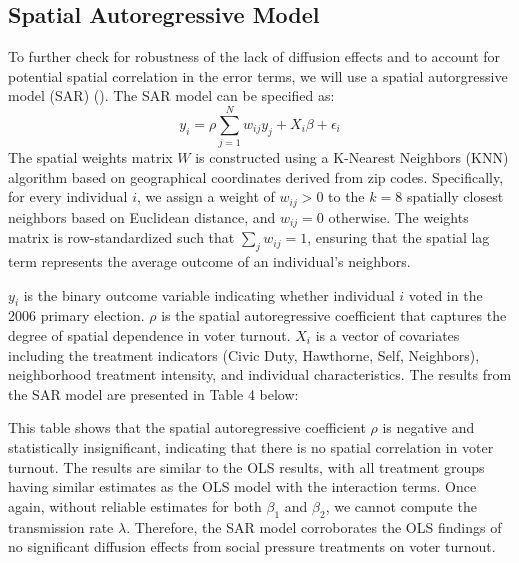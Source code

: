 \documentclass[11pt]{article}
\begin{document}
\subsection{Spatial Autoregressive Model}
To further check for robustness of the lack of diffusion effects and to account for potential spatial correlation in the error terms, we will use a spatial autorgressive model (SAR) (\cite{lord_chapter_2021}). The SAR model can be specified as:
\begin{equation}
y_i = \rho \sum_{j=1}^{N} w_{ij} y_j + X_i \beta + \epsilon_i
\end{equation}
The spatial weights matrix $W$ is constructed using a K-Nearest Neighbors (KNN) algorithm based on geographical coordinates derived from zip codes. Specifically, for every individual $i$, we assign a weight of $w_{ij} > 0$ to the $k=8$ spatially closest neighbors based on Euclidean distance, and $w_{ij} = 0$ otherwise. The weights matrix is row-standardized such that $\sum_{j} w_{ij} = 1$, ensuring that the spatial lag term represents the average outcome of an individual's neighbors.

$y_i$ is the binary outcome variable indicating whether individual $i$ voted in the 2006 primary election. $\rho$ is the spatial autoregressive coefficient that captures the degree of spatial dependence in voter turnout. $X_i$ is a vector of covariates including the treatment indicators (Civic Duty, Hawthorne, Self, Neighbors), neighborhood treatment intensity, and individual characteristics. The results from the SAR model are presented in Table 4 below:

\begin{table}[H]
    \centering
    
\end{table}

This table shows that the spatial autoregressive coefficient $\rho$ is negative and statistically insignificant, indicating that there is no spatial correlation in voter turnout. The results are similar to the OLS results, with all treatment groups having similar estimates as the OLS model with the interaction terms. Once again, without reliable estimates for both $\beta_1$ and $\beta_2$, we cannot compute the transmission rate $\lambda$. Therefore, the SAR model corroborates the OLS findings of no significant diffusion effects from social pressure treatments on voter turnout.
\end{document}
